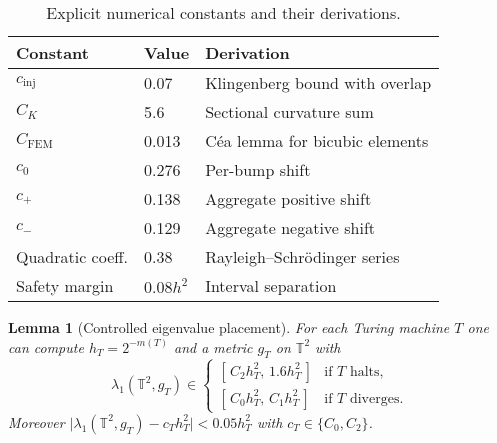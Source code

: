 \documentclass[11pt]{article}
\newtheorem{lemma}[theorem]{Lemma}
\theoremstyle{definition}\newtheorem{definition}[theorem]{Definition}
\theoremstyle{remark}\newtheorem{remark}[theorem]{Remark}
\begin{document}
\begin{table}[t]
\centering
\small
\caption{Explicit numerical constants and their derivations.}
\label{tab:constants}
\begin{tabular}{l|l|l}
Constant & Value & Derivation \\
\hline
$c_{\mathrm{inj}}$ & 0.07 & Klingenberg bound with overlap \\
$C_K$ & 5.6 & Sectional curvature sum \\
$C_{\mathrm{FEM}}$ & 0.013 & Céa lemma for bicubic elements \\
$c_0$ & 0.276 & Per-bump shift \\
$c_+$ & 0.138 & Aggregate positive shift \\
$c_-$ & 0.129 & Aggregate negative shift \\
Quadratic coeff. & 0.38 & Rayleigh–Schrödinger series \\
Safety margin & $0.08 h^2$ & Interval separation \\
\end{tabular}
\end{table}

\begin{lemma}[Controlled eigenvalue placement]\label{lem:transfer}
For each Turing machine $T$ one can compute $h_T=2^{-m(T)}$ and
a metric $g_T$ on $\mathbb T^{2}$ with
\[
\lambda_1(\mathbb T^{2},g_T)\in
\begin{cases}
[\,C_2h_T^{2},\,1.6h_T^{2}\,] &\text{if $T$ halts},\\[4pt]
[\,C_0h_T^{2},\,C_1h_T^{2}\,] &\text{if $T$ diverges}.
\end{cases}
\]
Moreover
$\bigl|\lambda_1(\mathbb T^{2},g_T)-c_T h_T^{2}\bigr|<0.05h_T^{2}$ with
$c_T\in\{C_0,C_2\}$.
\end{lemma}
\end{document}
